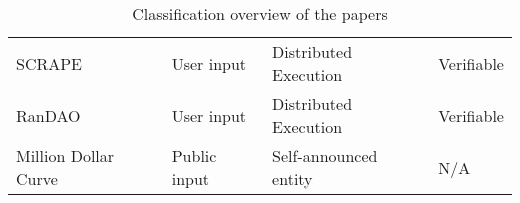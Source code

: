 \begin{table}[htbp]
\begin{tabularx}{\textwidth}{Xlll}
SCRAPE                           & User input                    & Distributed Execution                  & Verifiable                  \\ [1.5em]
RanDAO                           & User input                    & Distributed Execution                  & Verifiable                  \\ [1.5em]
Million Dollar Curve              & Public input                  & Self-announced entity                  & N/A                         \\ \bottomrule
    \end{tabularx}
    \caption{Classification overview of the papers}\label{tab:paper_overview}
\end{table}

